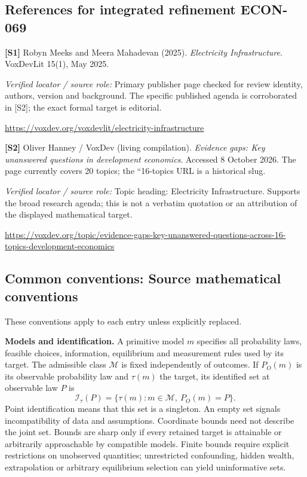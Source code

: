 \documentclass[11pt,a4paper]{article}
\begin{document}
\subsection*{References for integrated refinement ECON-069}
{\footnotesize\raggedright
\par\noindent\textbf{[S1]} Robyn Meeks and Meera Mahadevan (2025). \emph{Electricity Infrastructure}. VoxDevLit 15(1), May 2025.\par \textit{Verified locator / source role:} Primary publisher page checked for review identity, authors, version and background. The specific published agenda is corroborated in [S2]; the exact formal target is editorial.\par \url{https://voxdev.org/voxdevlit/electricity-infrastructure}\par\smallskip
\par\noindent\textbf{[S2]} Oliver Hanney / VoxDev (living compilation). \emph{Evidence gaps: Key unanswered questions in development economics}. Accessed 8 October 2026. The page currently covers 20 topics; the ``16-topics URL is a historical slug.\par \textit{Verified locator / source role:} Topic heading: Electricity Infrastructure. Supports the broad research agenda; this is not a verbatim quotation or an attribution of the displayed mathematical target.\par \url{https://voxdev.org/topic/evidence-gaps-key-unanswered-questions-across-16-topics-development-economics}\par\smallskip
}

\subsection*{Common conventions: Source mathematical conventions}

These conventions apply to each entry unless explicitly replaced.

\textbf{Models and identification.} A primitive model \(m\) specifies all probability laws, feasible choices, information, equilibrium and measurement rules used by its target. The admissible class \(\mathcal M\) is fixed independently of outcomes. If \(P_O(m)\) is its observable probability law and \(\tau(m)\) the target, its identified set at observable law \(P\) is
\[
 \mathcal I_\tau(P)=\{\tau(m):m\in\mathcal M,\ P_O(m)=P\}.
\]
Point identification means that this set is a singleton. An empty set signals incompatibility of data and assumptions. Coordinate bounds need not describe the joint set. Bounds are sharp only if every retained target is attainable or arbitrarily approachable by compatible models. Finite bounds require explicit restrictions on unobserved quantities; unrestricted confounding, hidden wealth, extrapolation or arbitrary equilibrium selection can yield uninformative sets.
\end{document}
